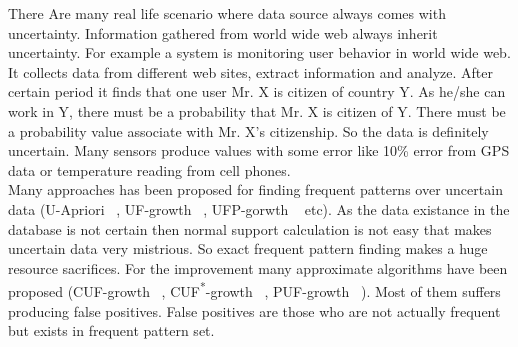 There Are many real life scenario where data source always comes with uncertainty. Information gathered from world wide web always inherit uncertainty. For example a system is monitoring user behavior in world wide web. It collects data from different web sites, extract information and analyze. After certain period it finds that one user Mr. X is citizen of country Y. As he/she can work in Y, there must be a probability that Mr. X is citizen of Y. There must be a probability value associate with Mr. X's citizenship. So the data is definitely uncertain. Many sensors produce values with some error like 10\% error from GPS data or temperature reading from cell phones.\\
Many approaches has been proposed for finding frequent patterns over uncertain data (U-Apriori ~\cite{u_priori}, UF-growth ~\cite{uf_growth}, UFP-gorwth ~\cite{ufp_growth} etc). As the data existance in the database is not certain then normal support calculation is not easy that makes uncertain data very mistrious. So exact frequent pattern finding makes a huge resource sacrifices. For the improvement many approximate algorithms have been proposed (CUF-growth ~\cite{cuf_growth}, CUF\textsuperscript{*}-growth ~\cite{cuf_growth}, PUF-growth ~\cite{puf_growth}). Most of them suffers producing false positives. False positives are those who are not actually frequent but exists in frequent pattern set.

